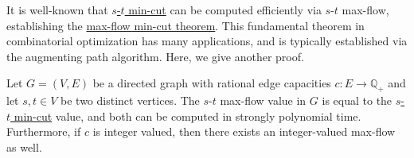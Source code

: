 It is well-known that \hyperref[prb:s-t-min-cut]{\(s\)-\(t\) min-cut} can be computed efficiently via \(s\)-\(t\) max-flow, establishing the \hyperref[thm:max-flow-min-cut]{max-flow min-cut theorem}. This fundamental theorem in combinatorial optimization has many applications, and is typically established via the augmenting path algorithm. Here, we give another proof.

\begin{theorem}\label{thm:max-flow-min-cut}
	Let \(G = (V, E)\) be a directed graph with rational edge capacities \(c \colon E \to \mathbb{Q} _+\) and let \(s, t\in V\) be two distinct vertices. The \(s\)-\(t\) max-flow value in \(G\) is equal to the \hyperref[prb:s-t-min-cut]{\(s\)-\(t\) min-cut} value, and both can be computed in strongly polynomial time. Furthermore, if \(c\) is integer valued, then there exists an integer-valued max-flow as well.
\end{theorem}
